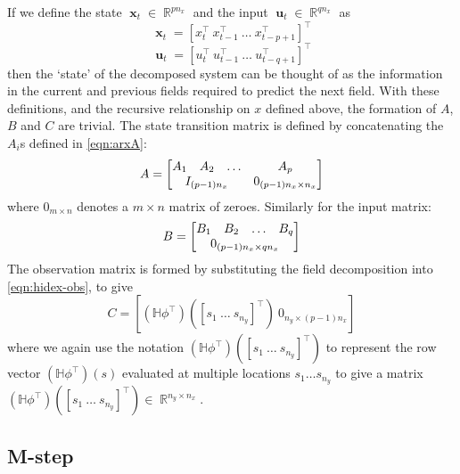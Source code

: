 \documentclass{IEEEtran}
\DeclareMathOperator{\R}{\mathbb{R}}
\DeclareMathOperator{\xvec}{\mathbf{x}}
\DeclareMathOperator{\uvec}{\mathbf{u}}
\begin{document}
If we define the state $\xvec_t \in \R^{pn_x}$ and the input $\uvec_t \in \R^{qn_x}$ as 
\begin{equation}
	\xvec_t = [x_t^\top ~ x_{t-1}^\top ~ \ldots ~ x_{t-p+1}^\top]^\top
\end{equation}
\begin{equation}
	\uvec_t = [u_t^\top ~ u_{t-1}^\top ~ \ldots ~ u_{t-q+1}^\top]^\top
\end{equation}
then the `state' of the decomposed system can be thought of as the information in the current and previous fields required to predict the next field. With these definitions, and the recursive relationship on $x$ defined above, the formation of $A$, $B$ and $C$ are trivial. The state transition matrix is defined by concatenating the $A_i$s defined in \ref{eqn:arxA}:
\begin{equation}
	A = \begin{bmatrix}
	A_1 & A_2 & \ldots & A_p \\
	\multicolumn{3}{c}{I_{(p-1)n_x}} & 0_{(p-1)n_x \times n_x}
	\end{bmatrix}
\end{equation}
where $0_{m\times n}$ denotes a $m\times n$ matrix of zeroes. Similarly for the input matrix:
\begin{equation}
	B = \begin{bmatrix}
	B_1 & B_2 & \ldots & B_q \\
	\multicolumn{4}{c}{0_{(p-1)n_x\times qn_x}}
	\end{bmatrix}
\end{equation}
The observation matrix is formed by substituting the field decomposition into \ref{eqn:hidex-obs}, to give
\begin{equation}
	C = [(\mathbb{H}\phi^\top)([s_1 ~ \ldots ~ s_{n_y}]^\top) ~ 0_{n_y \times (p-1)n_x}]
\end{equation}
where we again use the notation $(\mathbb{H}\phi^\top)([s_1 ~  \ldots ~ s_{n_y}]^\top)$ to represent the row vector $(\mathbb{H}\phi^\top)(s)$ evaluated at multiple locations $s_1 \ldots s_{n_y}$ to give a matrix $(\mathbb{H}\phi^\top)([s_1 ~  \ldots ~ s_{n_y}]^\top) \in \R^{n_y \times n_x}$.


\subsection{M-step}
\end{document}
